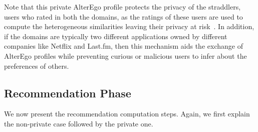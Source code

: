 Note that this private AlterEgo profile protects the privacy of the straddlers, users who rated in both the domains, as the ratings of these users are used to compute the heterogeneous similarities leaving their privacy at risk~\cite{ramakrishnan2001privacy}. In addition, if the domains are typically two different applications owned by different companies like Netflix and Last.fm, then this mechanism aids the exchange of AlterEgo profiles while preventing curious or malicious users to infer about the preferences of others. 






\subsection{Recommendation Phase}
We now present the recommendation computation steps. Again, we first explain the non-private case followed by the private one.

